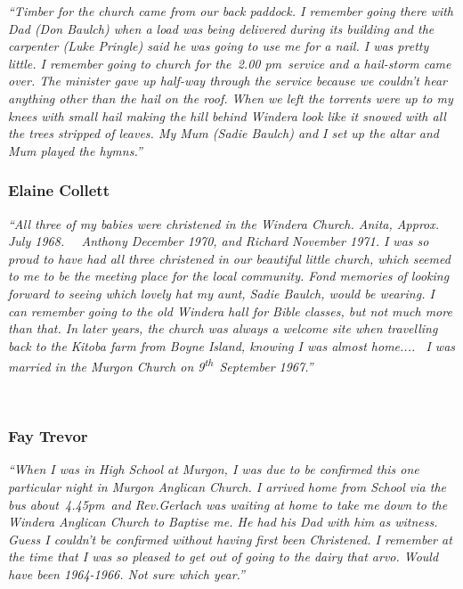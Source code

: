 \emph{``Timber for the church came from our back paddock. I remember going there with Dad (Don Baulch) when a load was being delivered during its building and the carpenter (Luke Pringle) said he was going to use me for a nail. I was pretty little. I remember going to church for the~2.00 pm~service and a hail-storm came over. The minister gave up half-way through the service because we couldn't hear anything other than the hail on the roof. When we left the torrents were up to my knees with small hail making the hill behind Windera look like it snowed with all the trees stripped of leaves. My Mum (Sadie Baulch) and I set up the altar and Mum played the hymns.''}



\subsubsection{Elaine Collett}



\emph{``All three of my babies were christened in the Windera Church. Anita, Approx. July 1968.~~ Anthony December 1970, and Richard November 1971. I was so proud to have had all three christened in our beautiful little church, which seemed to me to be the meeting place for the local community. Fond memories of looking forward to seeing which lovely hat my aunt, Sadie Baulch, would be wearing. I can remember going to the old Windera hall for Bible classes, but not much more than that. In later years, the church was always a welcome site when travelling back to the Kitoba farm from Boyne Island, knowing I was almost home.... ~I was married in the Murgon Church on 9\textsuperscript{th}~September 1967.''}



~



\subsubsection{Fay Trevor}



\emph{``When I was in High School at Murgon, I was due to be confirmed this one particular night in Murgon Anglican Church. I arrived home from School via the bus about~4.45pm~and Rev.Gerlach was waiting at home to take me down to the Windera Anglican Church to Baptise me. He had his Dad with him as witness. Guess I couldn't be confirmed without having first been Christened. I remember at the time that I was so pleased to get out of going to the dairy that arvo. Would have been 1964-1966. Not sure which year.''}



